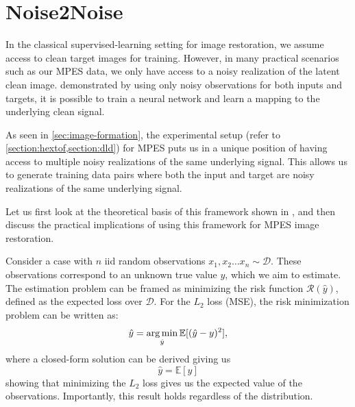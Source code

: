 
\section{Noise2Noise}
In the classical supervised-learning setting for image restoration, we assume access to clean target images for training. However, in many practical scenarios such as our \gls{MPES} data, we only have access to a noisy realization of the latent clean image. \citeauthor{lehtinenNoise2NoiseLearningImage2018} demonstrated by using only noisy observations for both inputs and targets, it is possible to train a neural network and learn a mapping to the underlying clean signal. 

As seen in \cref{sec:image-formation}, the experimental setup (refer to \cref{section:hextof,section:dld}) for \gls{MPES} puts us in a unique position of having access to multiple noisy realizations of the same underlying signal. This allows us to generate training data pairs where both the input and target are noisy realizations of the same underlying signal.

Let us first look at the theoretical basis of this framework shown in \cite{lehtinenNoise2NoiseLearningImage2018}, and then discuss the practical implications of using this framework for \gls{MPES} image restoration.

Consider a case with $n$ \gls{iid} random observations $x_1, x_2 \dots x_n \sim \mathcal{D}$. These observations correspond to an unknown true value $y$, which we aim to estimate. The estimation problem can be framed as minimizing the risk function $\mathcal{R}(\hat{y})$, defined as the expected loss over $\mathcal{D}$. For the $L_2$ loss (\gls{MSE}), the risk minimization problem can be written as:
\begin{equation}
    \hat{y} = \operatorname*{arg\,min}_{\hat{y}} \mathbb{E}[(\hat{y} - y)^2],
\end{equation}
where a closed-form solution can be derived giving us
\begin{equation}
    \hat{y} = \mathbb{E}[y]
\end{equation}
showing that minimizing the $L_2$ loss gives us the expected value of the observations. Importantly, this result holds regardless of the distribution.

